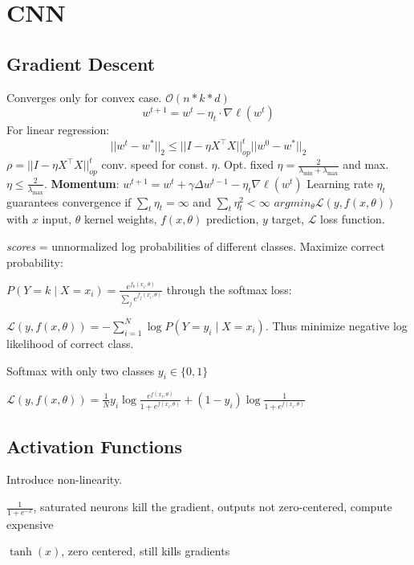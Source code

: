 \section{CNN}
 \subsection*{Gradient Descent}
 Converges only for convex case. $\mathcal{O}(n * k * d)$
 $$
 	w^{t+1} = w^t - \eta_t \cdot \nabla \ell(w^t)
 $$
 For linear regression:
 $$
 	||w^t - w^*||_2 \leq ||I - \eta X^\top X||_{op}^t ||w^0 - w^*||_2
 $$
 $\rho = ||I - \eta X^\top X||_{op}^t$ conv. speed for const. $\eta$. Opt. fixed $\eta = \frac{2}{\lambda_{\text{min}} + \lambda_{\text{max}}}$ and max. $\eta \leq \frac{2}{\lambda_{\text{max}}}$. 
 \textbf{Momentum}: $w^{t+1} = w^t + \gamma \Delta w^{t-1} - \eta_t \nabla \ell(w^t)$
 Learning rate $\eta_t$ guarantees convergence if $\sum_t \eta_t = \infty$ and $\sum_t \eta_t^2 < \infty$
  $argmin_\theta \mathcal{L}(y, f(x, \theta))$ with
  $x$ input, $\theta$ kernel weights, $f(x, \theta)$ prediction, $y$ target, $\mathcal{L}$ loss function.

  \textit{scores} = unnormalized log probabilities of different classes. Maximize correct probability:

  \(P(Y = k \mid X = x_i) = \frac{e^{f_k(x_i, \theta)}}{\sum_j e^{f_j(x_i, \theta)}}\) through the softmax loss:
  
  \(\mathcal{L}(y, f(x, \theta)) = - \sum_{i=1}^N \log P(Y = y_i \mid X = x_i)\). Thus minimize negative log likelihood of correct class.

  Softmax with only two classes \(y_i \in \{0, 1\}\)
  \begin{center}
    \(\mathcal{L}(y, f(x, \theta)) = \frac{1}{N}y_i \log \frac{e^{f(x_i, \theta)}}{1 + e^{f(x_i, \theta)}} + (1 - y_i) \log \frac{1}{1 + e^{f(x_i, \theta)}}\)
  \end{center}

\subsection*{Activation Functions}
  Introduce non-linearity.


  \(\frac{1}{1 + e^{-x}}\), saturated neurons kill the gradient, outputs not zero-centered, compute expensive

  \(\tanh(x)\), zero centered, still kills gradients


